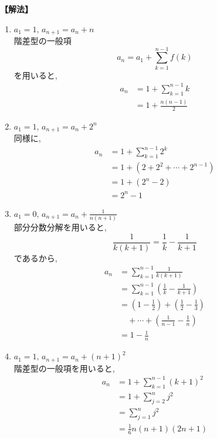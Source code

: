 \noindent\textbf{【解法】}
\begin{enumerate}[label=(\arabic*),parsep=3pt]
  \item $\displaystyle a_1=1,\,a_{n+1}=a_n+n$\\
        階差型の一般項
        \[
          a_n=a_1+\sum_{k=1}^{n-1}f(k)
        \]
        を用いると,
        \begin{align*}
          a_n
           & =1+\sum_{k=1}^{n-1}k \\
           & =1+\frac{n(n-1)}{2}
        \end{align*}

  \item $\displaystyle a_1=1,\,a_{n+1}=a_n+2^n$\\
        同様に,
        \begin{align*}
          a_n
           & =1+\sum_{k=1}^{n-1}2^k    \\
           & =1+(2+2^2+\cdots+2^{n-1}) \\
           & =1+(2^n-2)                \\
           & =2^n-1
        \end{align*}

  \item $\displaystyle a_1=0,\,a_{n+1}=a_n+\frac{1}{n(n+1)}$\\
        部分分数分解を用いると,
        \[
          \frac{1}{k(k+1)}
          =\frac{1}{k}-\frac{1}{k+1}
        \]
        であるから,
        \begin{align*}
          a_n
           & =\sum_{k=1}^{n-1}\frac{1}{k(k+1)}   \\
           & =\sum_{k=1}^{n-1}
          \left(\frac{1}{k}-\frac{1}{k+1}\right) \\
           & =\left(1-\frac12\right)
          +\left(\frac12-\frac13\right)\\
           & \quad+\cdots+\left(\frac{1}{n-1}-\frac1n\right)\\
           & =1-\frac1n
        \end{align*}

  \item $\displaystyle a_1=1,\,a_{n+1}=a_n+(n+1)^2$\\
        階差型の一般項を用いると,
        \begin{align*}
          a_n
           & =1+\sum_{k=1}^{n-1}(k+1)^2 \\
           & =1+\sum_{j=2}^{n}j^2       \\
           & =\sum_{j=1}^{n}j^2         \\
           & =\frac{1}{6}n(n+1)(2n+1)
        \end{align*}
\end{enumerate}
